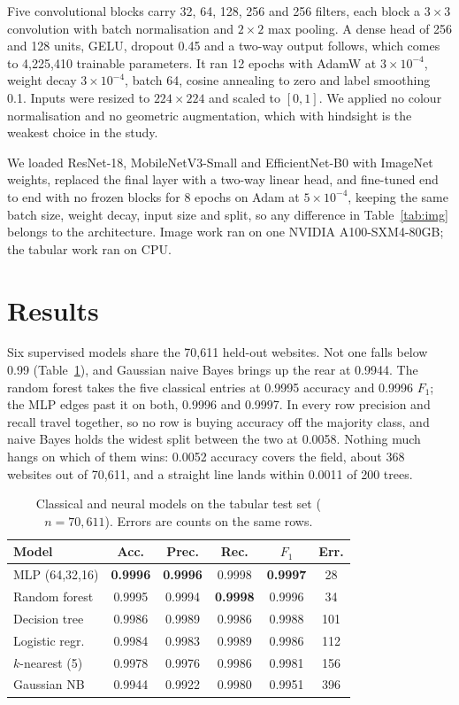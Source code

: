 \documentclass[11pt,journal,a4paper]{IEEEtran}
\newcommand{\tabfont}{\fontsize{11}{13}\selectfont}
\begin{document}
Five convolutional blocks carry 32, 64, 128, 256 and 256 filters, each block a
$3\times3$ convolution with batch normalisation and $2\times2$ max pooling. A dense head of 256 and 128 units,
GELU, dropout 0.45 and a two-way output follows, which comes to 4{,}225{,}410 trainable parameters. It ran 12 epochs with
AdamW at $3\times10^{-4}$, weight decay $3\times10^{-4}$, batch 64, cosine annealing to zero and label smoothing
0.1. Inputs were resized to $224\times224$ and scaled to $[0,1]$. We applied no colour normalisation and no
geometric augmentation, which with hindsight is the weakest choice in the study.

We loaded ResNet-18, MobileNetV3-Small and EfficientNet-B0 with ImageNet weights, replaced the final layer with a
two-way linear head, and fine-tuned end to end with no frozen blocks for 8 epochs on Adam at $5\times10^{-4}$,
keeping the same batch size, weight decay, input size and split, so any difference in
Table~\ref{tab:img} belongs to the architecture. Image work ran on one NVIDIA A100-SXM4-80GB; the tabular work
ran on CPU.

\section{Results}
\label{sec:res}

Six supervised models share the 70{,}611 held-out websites. Not one falls below 0.99 (Table~\ref{tab:class}),
and Gaussian naive Bayes brings up the rear at 0.9944. The random forest takes the five classical entries at 0.9995
accuracy and 0.9996 $F_1$; the MLP edges past it on both, 0.9996 and 0.9997. In every row precision and recall
travel together, so no row is buying accuracy off the majority class, and naive Bayes holds the widest split
between the two at 0.0058. Nothing much hangs on which of them wins: 0.0052 accuracy covers the field, about 368 websites out of 70{,}611,
and a straight line lands within 0.0011 of 200 trees.

\begin{table}[!t]
\centering
\caption{Classical and neural models on the tabular test set ($n=70{,}611$). Errors are counts on the same rows.}
\label{tab:class}
\tabfont
\setlength{\tabcolsep}{3.5pt}
\begin{tabular}{@{}lccccc@{}}
\toprule
\textbf{Model} & \textbf{Acc.} & \textbf{Prec.} & \textbf{Rec.} & \textbf{$F_1$} & \textbf{Err.} \\
\midrule
MLP (64,32,16)  & \textbf{0.9996} & \textbf{0.9996} & 0.9998 & \textbf{0.9997} & 28 \\
Random forest   & 0.9995 & 0.9994 & \textbf{0.9998} & 0.9996 & 34 \\
Decision tree   & 0.9986 & 0.9989 & 0.9986 & 0.9988 & 101 \\
Logistic regr.  & 0.9984 & 0.9983 & 0.9989 & 0.9986 & 112 \\
$k$-nearest (5) & 0.9978 & 0.9976 & 0.9986 & 0.9981 & 156 \\
Gaussian NB     & 0.9944 & 0.9922 & 0.9980 & 0.9951 & 396 \\
\bottomrule
\end{tabular}
\end{table}
\end{document}
